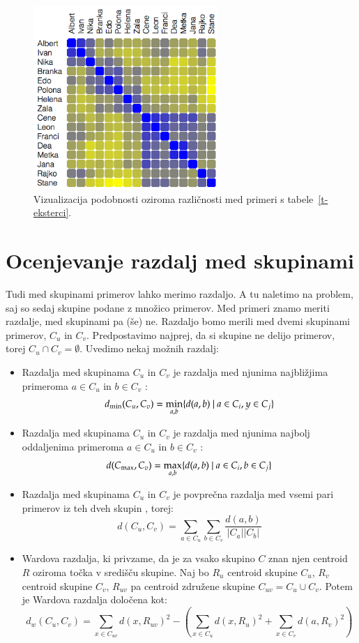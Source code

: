 \begin{figure}[htbp]
\begin{center}
\includegraphics[width=7cm]{slike/toplotna-karta.png}
\caption{Vizualizacija podobnosti oziroma različnosti med primeri s
  tabele~\ref{t-eksterci}.}
\label{f-toplotna-karta}
\end{center}
\end{figure}

\section{Ocenjevanje razdalj med skupinami}

Tudi med skupinami primerov lahko merimo razdaljo. A tu naletimo na
problem, saj so sedaj skupine podane z množico primerov. Med primeri
znamo meriti razdalje, med skupinami pa (še) ne. Razdaljo bomo merili
med dvemi skupinami primerov, $C_u$ in $C_v$. Predpostavimo najprej,
da si skupine ne delijo primerov, torej $C_u\cap
C_v=\emptyset$. Uvedimo nekaj možnih razdalj:
\begin{itemize}
\item Razdalja med skupinama $C_u$ in $C_v$ je razdalja med njunima
  najbližjima primeroma $a\in C_u$ in $b\in C_v$ :
$$d_{\rm min}(C_u, C_v)=\min_{a,b}\{d(a,b)\ |\ a\in C_i, y\in C_j\}$$
\item Razdalja med skupinama $C_u$ in $C_v$ je razdalja med njunima
  najbolj oddaljenima primeroma $a\in C_u$ in $b\in C_v$
  :
$$d(C_{\rm max}, C_v)=\max_{a,b}\{d(a,b)\ |\ a\in C_i, b\in C_j\}$$
\item Razdalja med skupinama $C_u$ in $C_v$ je povprečna razdalja med
  vsemi pari primerov iz teh dveh skupin , torej:
$$d(C_u, C_v)={\sum_{a\in C_u}\sum_{b\in C_v}  \frac{d(a,b)}{|C_a||C_b|}} $$
\item Wardova razdalja, ki privzame, da je za vsako skupino $C$ znan
  njen centroid $R$ oziroma točka v središču skupine. Naj bo $R_u$
  centroid skupine $C_u$, $R_v$
  centroid skupine $C_v$, $R_{uv}$ pa centroid združene skupine
  $C_{uv}=C_u\cup C_v$. Potem je Wardova razdalja določena kot:
$$d_w(C_u, C_v)=\sum_{x\in C_{uv}}d(x, R_{uv})^2 - (\sum_{x\in
    C_u}d(x, R_u)^2 + \sum_{x\in C_v}d(a, R_v)^2)$$
\end{itemize}

